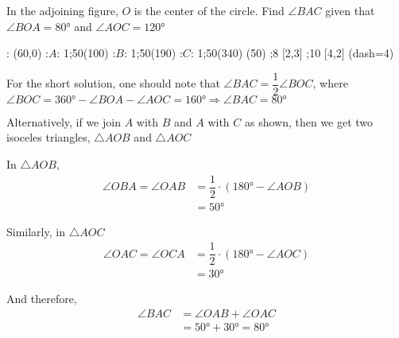 

\question[3]  In the adjoining figure, $O$ is the center of the circle. Find $\angle BAC$
given that $\angle BOA = \ang{80}$ and $\angle AOC = \ang{120}$


\ifprintanswers
\fi 
\begin{marginfigure}
    : (60,0)
    :$A$: 1;50(100)
    :$B$: 1;50(190)
    :$C$: 1;50(340)
	\figdrawbegin{}
	(50)
    \figdrawline [1,2]
    \figdrawline [1,3]
    \figdrawline [1,4]
    ;8 [2,3]
    ;10 [4,2]
    \ifprintanswers
      \figset (dash=4)
      \figdrawline [3,2,4]
    \fi
	\figdrawend
  \centerline{\box\figBoxA}
\end{marginfigure}
\begin{solution}[\halfpage]
  For the short solution, one should note that $\angle BAC = \dfrac{1}{2}\angle BOC$,
  where $\angle BOC = \ang{360} - \angle BOA - \angle AOC = \ang{160} \Rightarrow \angle BAC = \ang{80}$

	Alternatively, if we join $A$ with $B$ and $A$ with $C$ as shown, then we get two isoceles 
	triangles, $\triangle AOB$ and $\triangle AOC$
	
	In $\triangle AOB$,
	\begin{align}
		\angle OBA = \angle OAB &= \dfrac{1}{2}\cdot(\ang{180}-\angle AOB) \\
		                        &= \ang{50}
	\end{align}
	
	Similarly, in $\triangle AOC$
	\begin{align}
		\angle OAC = \angle OCA &= \dfrac{1}{2}\cdot(\ang{180}-\angle AOC) \\
		                        &= \ang{30}
	\end{align}
	
	And therefore,
	\begin{align}
		\angle BAC &= \angle OAB + \angle OAC \\
		           &= \ang{50} + \ang{30} = \ang{80}
	\end{align}

\end{solution}
